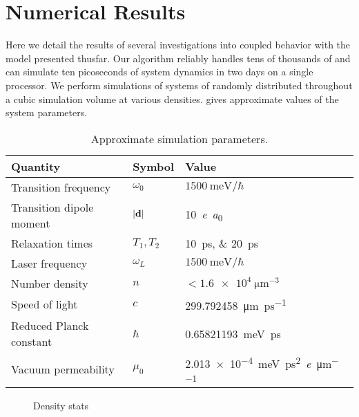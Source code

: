 \section{Numerical Results}
Here we detail the results of several investigations into coupled \qd{} behavior with the model presented thusfar.
Our algorithm reliably handles tens of thousands of \qds{} and can simulate ten picoseconds of system dynamics in two days on a single processor.
We perform simulations of systems of \qds{} randomly distributed throughout a cubic simulation volume at various densities.
 gives approximate values of the system parameters.

\begin{table}
  \begin{ruledtabular}
    \begin{tabular}{lll}
      Quantity                 & Symbol         & Value                        \\ \hline
      Transition frequency     & $\omega_0$     & $\SI{1500}{\milli\eV}/\hbar$ \\
      Transition dipole moment & $\abs{\vb{d}}$ & \SI{10}{\elementarycharge\bohr} \\
      Relaxation times         & $T_{1}, T_{2}$ & \SIlist{10;20}{\pico\second} \\
      Laser frequency          & $\omega_L$     & $\SI{1500}{\milli\eV}/\hbar$ \\
      Number density           & $n$            & $< \SI{1.6e4}{\micro\meter\tothe{-3}}$ \\
      \hline
      Speed of light           & $c$            & \SI{299.792458}{\micro\meter\per\pico\second} \\
      Reduced Planck constant  & $\hbar$        & \SI{0.65821193}{\milli\eV \pico\second} \\
      Vacuum permeability      & $\mu_0$        & \SI{2.013e-4}{\milli\eV \pico\second\squared \per \elementarycharge \per \micro\meter}
    \end{tabular}
  \end{ruledtabular}
  \caption{\label{table:parameters}Approximate simulation parameters.}
\end{table}

\begin{figure}
  
  \caption{\label{fig:density stats}Density stats}
\end{figure}
